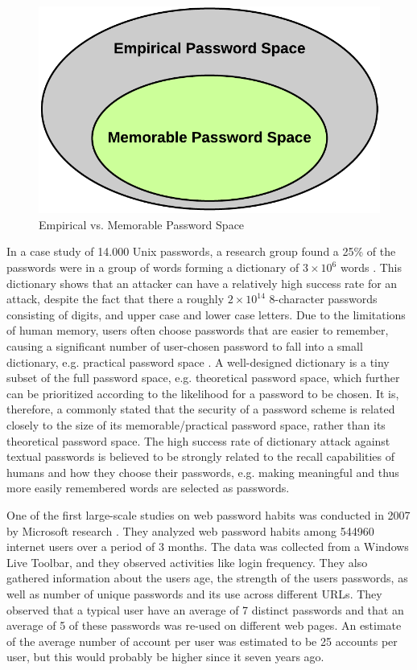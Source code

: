   \begin{figure}[H]
      \centering
      \includegraphics[scale=0.25]{pics/EmpiricalVsPractical.png}
      \caption{Empirical vs. Memorable Password Space}
      \label{fig:memorable}
    \end{figure}

  In a case study of 14.000 Unix passwords, a research group found a 25\% of the passwords were in a group of words forming a dictionary of $3\times10^{6}$ words \cite{UnixPasswords}. This dictionary shows that an attacker can have a relatively high success rate for an attack, despite the fact that there a roughly $2\times10^{14}$ 8-character passwords consisting of digits, and upper case and lower case letters. Due to the limitations of human memory, users often choose passwords that are easier to remember, causing a significant number of user-chosen password to fall into a small dictionary, e.g. practical password space \cite{Tao}. A well-designed dictionary is a tiny subset of the full password space, e.g. theoretical password space, which further can be prioritized according to the likelihood for a password to be chosen. It is, therefore, a commonly stated that the security of a password scheme is related closely to the size of its memorable/practical password space, rather than its theoretical password space. The high success rate of dictionary attack against textual passwords is believed to be strongly related to the recall capabilities of humans and how they choose their passwords, e.g. making meaningful and thus more easily remembered words are selected as passwords.

  One of the first large-scale studies on web password habits was conducted in 2007 by Microsoft research \cite{habits1}. They analyzed web password habits among 544960 internet users over a period of 3 months. The data was collected from a Windows Live Toolbar, and they observed activities like login frequency. They also gathered information about the users age, the strength of the users passwords, as well as number of unique passwords and its use across different URLs. They observed that a typical user have an average of 7 distinct passwords and that an average of 5 of these passwords was re-used on different web pages. An estimate of the average number of account per user was estimated to be 25 accounts per user, but this would probably be higher since it seven years ago. 

